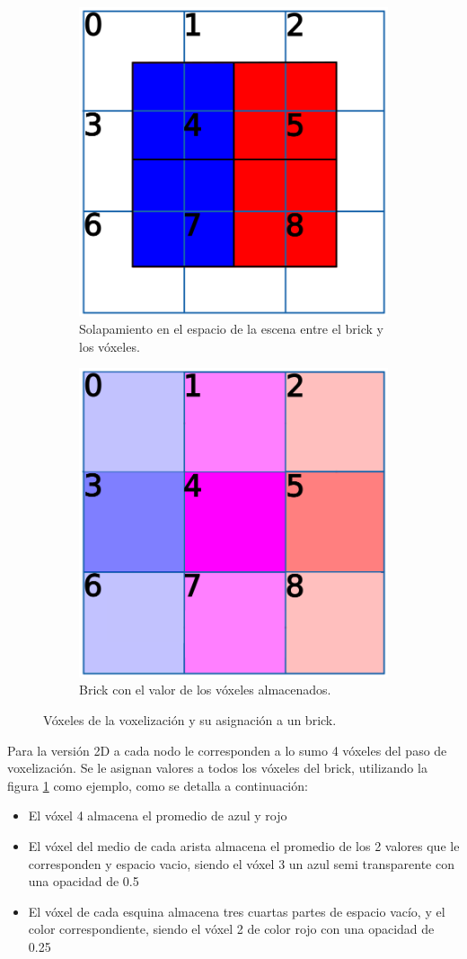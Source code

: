 \begin{figure}[ht]
    \begin{subfigure}{.49\textwidth}
        \centering
        \includegraphics[width=.5\textwidth]{voxels-to-bricks.png}
        \caption{Solapamiento en el espacio de la escena entre el brick y los vóxeles.}
    \end{subfigure}
    \begin{subfigure}{.49\textwidth}
        \centering
        \includegraphics[width=.5\textwidth]{voxels-to-bricks-b.png}
        \caption{Brick con el valor de los vóxeles almacenados.}
    \end{subfigure}
    \caption{Vóxeles de la voxelización y su asignación a un brick.}
    \label{fig:voxels-to-bricks}
\end{figure}

Para la versión 2D a cada nodo le corresponden a lo sumo 4 vóxeles del paso de voxelización.
Se le asignan valores a todos los vóxeles del brick, utilizando la figura \ref{fig:voxels-to-bricks} como ejemplo, como se detalla a continuación:
\begin{itemize}
    \item El vóxel 4 almacena el promedio de azul y rojo
    \item El vóxel del medio de cada arista almacena el promedio de los 2 valores que le corresponden y espacio vacio, siendo el vóxel 3 un azul semi transparente con una opacidad de 0.5
    \item El vóxel de cada esquina almacena tres cuartas partes de espacio vacío, y el color correspondiente, siendo el vóxel 2 de color rojo con una opacidad de 0.25
\end{itemize}

